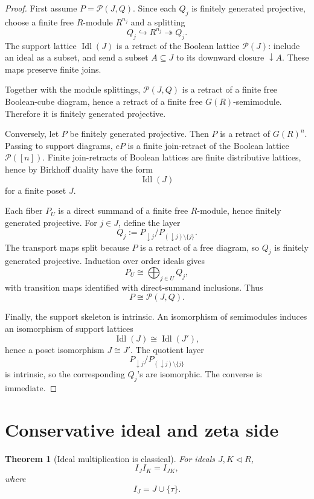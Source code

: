 \documentclass[11pt]{article}
\newtheorem{theorem}{Theorem}[section]
\begin{document}
\begin{proof}
First assume \(P=\mathcal P(J,Q)\). Since each \(Q_j\) is finitely generated projective, choose a finite free \(R\)-module \(R^{n_j}\) and a splitting
\[
Q_j\hookrightarrow R^{n_j}\twoheadrightarrow Q_j.
\]
The support lattice \(\operatorname{Idl}(J)\) is a retract of the Boolean lattice \(\mathcal P(J)\): include an ideal as a subset, and send a subset \(A\subseteq J\) to its downward closure \(\downarrow A\). These maps preserve finite joins.

Together with the module splittings, \(\mathcal P(J,Q)\) is a retract of a finite free Boolean-cube diagram, hence a retract of a finite free \(G(R)\)-semimodule. Therefore it is finitely generated projective.

Conversely, let \(P\) be finitely generated projective. Then \(P\) is a retract of \(G(R)^n\). Passing to support diagrams, \(eP\) is a finite join-retract of the Boolean lattice \(\mathcal P([n])\). Finite join-retracts of Boolean lattices are finite distributive lattices, hence by Birkhoff duality have the form
\[
\operatorname{Idl}(J)
\]
for a finite poset \(J\).

Each fiber \(P_U\) is a direct summand of a finite free \(R\)-module, hence finitely generated projective. For \(j\in J\), define the layer
\[
Q_j:=
P_{\downarrow j}/P_{(\downarrow j)\setminus\{j\}}.
\]
The transport maps split because \(P\) is a retract of a free diagram, so \(Q_j\) is finitely generated projective. Induction over order ideals gives
\[
P_U\cong\bigoplus_{j\in U}Q_j,
\]
with transition maps identified with direct-summand inclusions. Thus
\[
P\cong\mathcal P(J,Q).
\]

Finally, the support skeleton is intrinsic. An isomorphism of semimodules induces an isomorphism of support lattices
\[
\operatorname{Idl}(J)\cong\operatorname{Idl}(J'),
\]
hence a poset isomorphism \(J\cong J'\). The quotient layer
\[
P_{\downarrow j}/P_{(\downarrow j)\setminus\{j\}}
\]
is intrinsic, so the corresponding \(Q_j\)'s are isomorphic. The converse is immediate.
\end{proof}

\section{Conservative ideal and zeta side}

\begin{theorem}[Ideal multiplication is classical]
For ideals \(J,K\triangleleft R\),
\[
I_JI_K=I_{JK},
\]
where
\[
I_J=J\cup\{\tau\}.
\]
\end{theorem}
\end{document}
